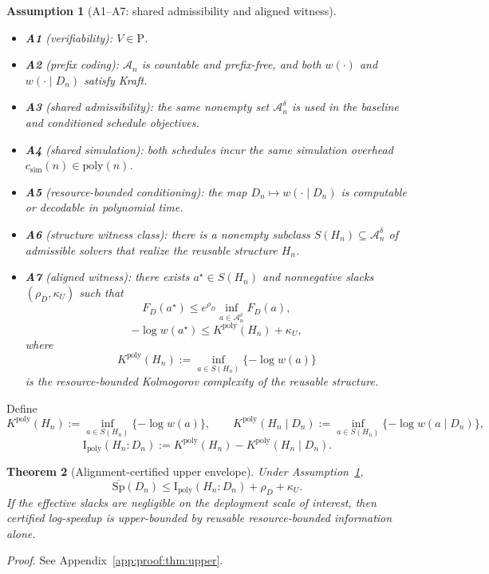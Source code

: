 \documentclass[10pt]{article}
\theoremstyle{paperplain}
\newtheorem{theorem}{Theorem}[section]
\theoremstyle{paperdefinition}
\newtheorem{assumption}[theorem]{Assumption}
\theoremstyle{paperremark}
\newcommand{\poly}{\mathrm{poly}}
\newcommand{\I}{\mathrm{I}}
\newcommand{\cA}{\mathcal{A}}
\newcommand{\Sp}{\mathrm{Sp}}
\begin{document}
\begin{assumption}[A1--A7: shared admissibility and aligned witness]\label{ass:upper-envelope}
\leavevmode
\begin{itemize}
\item \textbf{A1} (verifiability): $V\in \mathrm{P}$.
\item \textbf{A2} (prefix coding): $\cA_n$ is countable and prefix-free, and both $w(\cdot)$ and $w(\cdot\mid D_n)$ satisfy Kraft.
\item \textbf{A3} (shared admissibility): the same nonempty set $\cA_n^\delta$ is used in the baseline and conditioned schedule objectives.
\item \textbf{A4} (shared simulation): both schedules incur the same simulation overhead $c_{\mathrm{sim}}(n)\in\poly(n)$.
\item \textbf{A5} (resource-bounded conditioning): the map $D_n\mapsto w(\cdot\mid D_n)$ is computable or decodable in polynomial time.
\item \textbf{A6} (structure witness class): there is a nonempty subclass $S(H_n)\subseteq \cA_n^\delta$ of admissible solvers that realize the reusable structure $H_n$.
\item \textbf{A7} (aligned witness): there exists $a^\star\in S(H_n)$ and nonnegative slacks $(\rho_D,\kappa_U)$ such that
\[
F_D(a^\star)\le e^{\rho_D}\inf_{a\in\cA_n^\delta}F_D(a),
\]
\[
-\log w(a^\star)\le K^{\poly}(H_n)+\kappa_U,
\]
where
\[
K^{\poly}(H_n):=\inf_{a\in S(H_n)}\{-\log w(a)\}
\]
is the resource-bounded Kolmogorov complexity of the reusable structure.
\end{itemize}
\end{assumption}

Define
\[
K^{\poly}(H_n):=\inf_{a\in S(H_n)}\{-\log w(a)\},
\qquad
K^{\poly}(H_n\mid D_n):=\inf_{a\in S(H_n)}\{-\log w(a\mid D_n)\},
\]
\[
\I_{\mathrm{poly}}(H_n:D_n):=K^{\poly}(H_n)-K^{\poly}(H_n\mid D_n).
\]

\begin{theorem}[Alignment-certified upper envelope]\label{thm:upper}\label{thm:upper-expectation}
Under Assumption~\ref{ass:upper-envelope},
\[
\overline{\Sp}(D_n)
\le
\I_{\mathrm{poly}}(H_n:D_n)+\rho_D+\kappa_U.
\]
If the effective slacks are negligible on the deployment scale of interest, then certified log-speedup is upper-bounded by reusable resource-bounded information alone.
\end{theorem}

\par\noindent\emph{Proof.} See Appendix~\ref{app:proof:thm:upper}.\par
\end{document}
